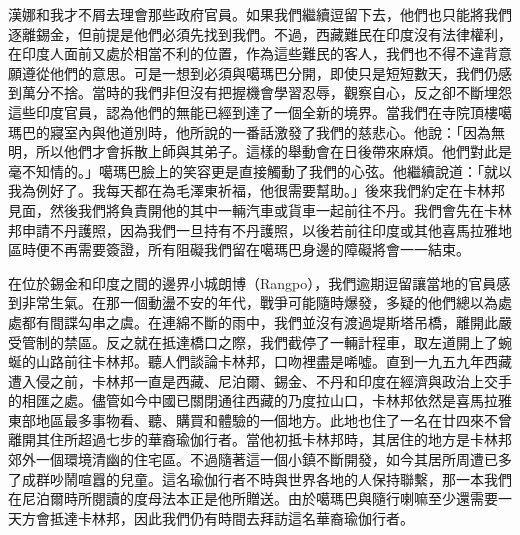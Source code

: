 漢娜和我才不屑去理會那些政府官員。如果我們繼續逗留下去，他們也只能將我們逐離錫金，但前提是他們必須先找到我們。不過，西藏難民在印度沒有法律權利，在印度人面前又處於相當不利的位置，作為這些難民的客人，我們也不得不違背意願遵從他們的意思。可是一想到必須與噶瑪巴分開，即使只是短短數天，我們仍感到萬分不捨。當時的我們非但沒有把握機會學習忍辱，觀察自心，反之卻不斷埋怨這些印度官員，認為他們的無能已經到達了一個全新的境界。當我們在寺院頂樓噶瑪巴的寢室內與他道別時，他所說的一番話激發了我們的慈悲心。他說：「因為無明，所以他們才會拆散上師與其弟子。這樣的舉動會在日後帶來麻煩。他們對此是毫不知情的。」噶瑪巴臉上的笑容更是直接觸動了我們的心弦。他繼續說道：「就以我為例好了。我每天都在為毛澤東祈福，他很需要幫助。」後來我們約定在卡林邦見面，然後我們將負責開他的其中一輛汽車或貨車一起前往不丹。我們會先在卡林邦申請不丹護照，因為我們一旦持有不丹護照，以後若前往印度或其他喜馬拉雅地區時便不再需要簽證，所有阻礙我們留在噶瑪巴身邊的障礙將會一一結束。

在位於錫金和印度之間的邊界小城朗博（Rangpo），我們逾期逗留讓當地的官員感到非常生氣。在那一個動盪不安的年代，戰爭可能隨時爆發，多疑的他們總以為處處都有間諜勾串之虞。在連綿不斷的雨中，我們並沒有渡過堤斯塔吊橋，離開此嚴受管制的禁區。反之就在抵達橋口之際，我們截停了一輛計程車，取左道開上了蜿蜒的山路前往卡林邦。聽人們談論卡林邦，口吻裡盡是唏噓。直到一九五九年西藏遭入侵之前，卡林邦一直是西藏、尼泊爾、錫金、不丹和印度在經濟與政治上交手的相匯之處。儘管如今中國已關閉通往西藏的乃度拉山口，卡林邦依然是喜馬拉雅東部地區最多事物看、聽、購買和體驗的一個地方。此地也住了一名在廿四來不曾離開其住所超過七步的華裔瑜伽行者。當他初抵卡林邦時，其居住的地方是卡林邦郊外一個環境清幽的住宅區。不過隨著這一個小鎮不斷開發，如今其居所周遭已多了成群吵鬧喧囂的兒童。這名瑜伽行者不時與世界各地的人保持聯繫，那一本我們在尼泊爾時所閱讀的度母法本正是他所贈送。由於噶瑪巴與隨行喇嘛至少還需要一天方會抵達卡林邦，因此我們仍有時間去拜訪這名華裔瑜伽行者。

